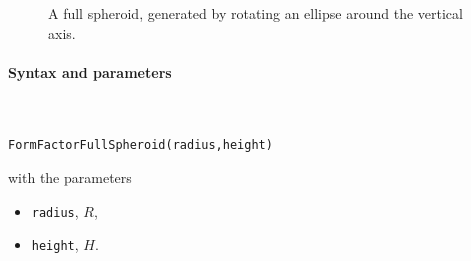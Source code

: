 \begin{figure}[H]
\hfill
{}
\hfill
{}
\hfill
{}
\hfill
\caption{A full spheroid, generated by rotating an ellipse around the vertical axis.}
\end{figure}

\FloatBarrier

\paragraph{Syntax and parameters}\strut\\[-2ex plus .2ex minus .2ex]
\begin{lstlisting}[language=python, style=eclipseboxed,numbers=none,nolol]
  FormFactorFullSpheroid(radius,height)
\end{lstlisting}
with the parameters
\begin{itemize}
\item \texttt{radius}, $R$,
\item \texttt{height}, $H$.
\end{itemize}


